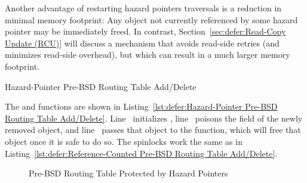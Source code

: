 Another advantage of restarting hazard pointers traversals is a reduction in
minimal memory footprint:
Any object not currently referenced by some hazard pointer may be
immediately freed.
In contrast,
Section~\ref{sec:defer:Read-Copy Update (RCU)}
will discuss a mechanism that avoids read-side retries (and minimizes
read-side overhead), but which can result in a much larger memory
footprint.

\fi

\begin{listing}[tbp]

\caption{Hazard-Pointer Pre-BSD Routing Table Add\slash Delete}
\label{lst:defer:Hazard-Pointer Pre-BSD Routing Table Add/Delete}
\end{listing}

\begin{fcvref}
The  and  functions are shown in
Listing~\ref{lst:defer:Hazard-Pointer Pre-BSD Routing Table Add/Delete}.
Line~ initializes ,
line~ poisons the  field of the newly removed
object, and
line~ passes that object to the
 function, which will free that object once it
is safe to do so.
The spinlocks work the same as in
Listing~\ref{lst:defer:Reference-Counted Pre-BSD Routing Table Add/Delete}.
\end{fcvref}

\begin{figure}[tb]
\centering
{}
\caption{Pre-BSD Routing Table Protected by Hazard Pointers}
\label{fig:defer:Pre-BSD Routing Table Protected by Hazard Pointers}
\end{figure}

